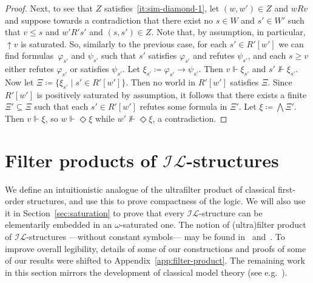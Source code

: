 \documentclass[submission,copyright,creativecommons]{eptcs}
\newcommand{\Zin}[2]{(#1,#2)\in Z}
\newcommand{\Z}{Z}
\newcommand{\ac}{R}
\renewcommand{\phi}{\varphi}
\newcommand{\IL}{\mathscr{I\!\!L}}   %
\begin{document}
\begin{proof}
  Next, to see that $\Z$ satisfies~\eqref{it:sim-diamond-1},
  let $\Zin{w}{w'}$ and $w \ac v$ and suppose towards a contradiction
  that there exist no $s \in W$ and $s' \in W'$ such that $v \leq s$ and $w' \ac' s'$
  and $\Zin{s}{s'}$.
%
  Note that, by assumption, in particular, ${\uparrow}v$ is saturated. So, similarly to the previous case,
  for each $s' \in R'[w']$ we can find formulas~$\phi_{s'}$ and $\psi_{s'}$
  such that $s'$ satisfies $\phi_{s'}$ and refutes $\psi_{s'}$,
  and each $s \geq v$ either refutes $\phi_{s'}$ or satisfies $\psi_{s'}$.
%
  Let $\xi_{s'} \coloneq \phi_{s'} \to \psi_{s'}$. Then $v \Vdash \xi_{s'}$ and $s' \not\Vdash \xi_{s'}$.
    Now let $\Xi \coloneq \{ \xi_{s'} \mid s' \in R'[w'] \}$.
    Then no world in $R'[w']$ satisfies $\Xi$.
    Since $R'[w']$ is positively saturated by assumption, it follows that there
    exists a finite $\Xi' \subseteq \Xi$ such that each $s' \in R'[w']$
    refutes some formula in $\Xi'$.
    Let $\xi \coloneq \bigwedge \Xi'$. Then $v \Vdash \xi$, so $w \Vdash \Diamond\xi$ while $w' \not\Vdash \Diamond\xi$,
    a contradiction.
\end{proof}



\section{Filter products of $\IL$-structures}
\label{sec:products}

  We define an intuitionistic analogue of the ultrafilter product of
  classical 
  first-order structures, and use this to prove compactness of the logic.
  We will also use it in Section~\ref{sec:saturation} to prove that every
  $\IL$-structure can be elementarily embedded in an $\omega$-saturated one.
  The notion of (ultra)filter product of $\IL$-structures
  ---without constant symbols---
  may be found in~\cite{Gab72} and~\cite[Chapter~III]{Mar79}.
  To improve overall legibility, details of some of our constructions and proofs of some of our results were shifted to Appendix~\ref{app:filter-product}.
  The remaining work in this section mirrors the development of classical
  model theory (see e.g.~\cite{ChaKei73}).
\end{document}
